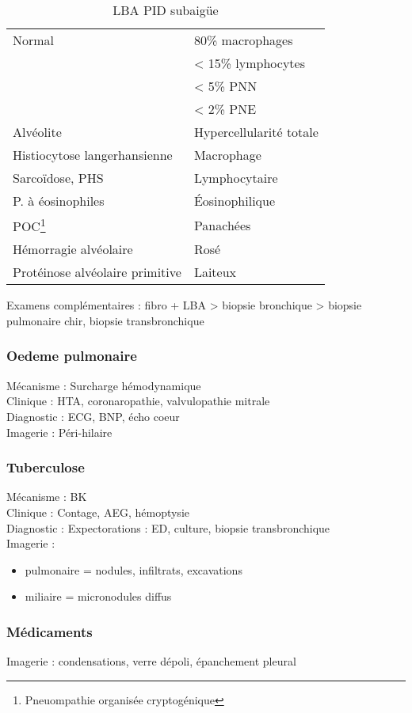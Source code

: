 \begin{table}[htbp]
\caption{LBA PID subaigüe}
\centering
\begin{tabular}{ll}
\toprule
Normal & 80\% macrophages\\
 & < 15\% lymphocytes\\
 & < 5\% PNN\\
 & < 2\% PNE\\
\midrule
Alvéolite & Hypercellularité totale\\
Histiocytose langerhansienne & Macrophage\\
Sarcoïdose, PHS & Lymphocytaire\\
P. à éosinophiles & Éosinophilique\\
POC\footnote{Pneuompathie organisée cryptogénique} & Panachées\\
Hémorragie alvéolaire & Rosé\\
Protéinose alvéolaire primitive & Laiteux\\
\bottomrule
\end{tabular}
\end{table}

Examens complémentaires : fibro + LBA > biopsie bronchique > biopsie pulmonaire chir, biopsie transbronchique

\subsubsection{Oedeme pulmonaire}
Mécanisme : Surcharge hémodynamique\\
Clinique : HTA, coronaropathie, valvulopathie mitrale\\
Diagnostic : ECG, BNP, écho coeur\\
Imagerie : Péri-hilaire

\subsubsection{Tuberculose}
Mécanisme : BK\\
Clinique : Contage, AEG, hémoptysie\\
Diagnostic : Expectorations : ED, culture, biopsie transbronchique\\
Imagerie : 
\begin{itemize}
\item pulmonaire = nodules, infiltrats, excavations
\item miliaire = micronodules diffus
\end{itemize}

\subsubsection{Médicaments}
Imagerie : condensations, verre dépoli, épanchement pleural

